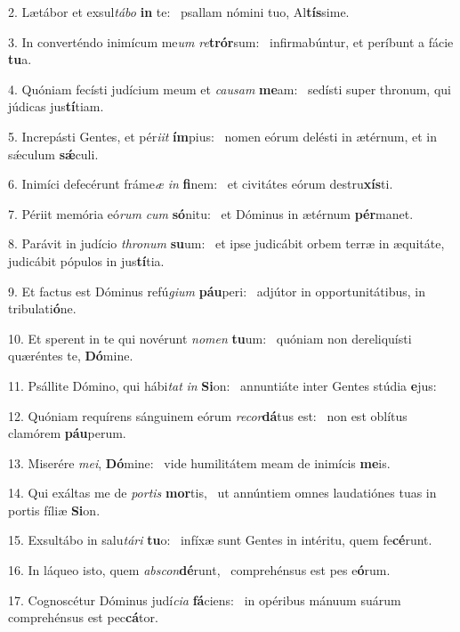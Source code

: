 2. Lætábor et exsul\textit{tá}\textit{bo} \textbf{in} te: \ast\  psallam nómini tuo, Al\textbf{tís}sime.\

3. In converténdo inimícum me\textit{um} \textit{re}\textbf{trór}sum: \ast\  infirmabúntur, et períbunt a fácie \textbf{tu}a.\

4. Quóniam fecísti judícium meum et \textit{cau}\textit{sam} \textbf{me}am: \ast\  sedísti super thronum, qui júdicas jus\textbf{tí}tiam.\

5. Increpásti Gentes, et pér\textit{i}\textit{it} \textbf{ím}pius: \ast\  nomen eórum delésti in ætérnum, et in sǽculum \textbf{sǽ}culi.\

6. Inimíci defecérunt fráme\textit{æ} \textit{in} \textbf{fi}nem: \ast\  et civitátes eórum destru\textbf{xís}ti.\

7. Périit memória eó\textit{rum} \textit{cum} \textbf{só}nitu: \ast\  et Dóminus in ætérnum \textbf{pér}manet.\

8. Parávit in judício \textit{thro}\textit{num} \textbf{su}um: \ast\  et ipse judicábit orbem terræ in æquitáte, judicábit pópulos in jus\textbf{tí}tia.\

9. Et factus est Dóminus refú\textit{gi}\textit{um} \textbf{páu}peri: \ast\  adjútor in opportunitátibus, in tribulati\textbf{ó}ne.\

10. Et sperent in te qui novérunt \textit{no}\textit{men} \textbf{tu}um: \ast\  quóniam non dereliquísti quæréntes te, \textbf{Dó}mine.\

11. Psállite Dómino, qui hábi\textit{tat} \textit{in} \textbf{Si}on: \ast\  annuntiáte inter Gentes stúdia \textbf{e}jus:\

12. Quóniam requírens sánguinem eórum \textit{re}\textit{cor}\textbf{dá}tus est: \ast\  non est oblítus clamórem \textbf{páu}perum.\

13. Miserére \textit{me}\textit{i}, \textbf{Dó}mine: \ast\  vide humilitátem meam de inimícis \textbf{me}is.\

14. Qui exáltas me de \textit{por}\textit{tis} \textbf{mor}tis, \ast\  ut annúntiem omnes laudatiónes tuas in portis fíliæ \textbf{Si}on.\

15. Exsultábo in salu\textit{tá}\textit{ri} \textbf{tu}o: \ast\  infíxæ sunt Gentes in intéritu, quem fe\textbf{cé}runt.\

16. In láqueo isto, quem \textit{abs}\textit{con}\textbf{dé}runt, \ast\  comprehénsus est pes e\textbf{ó}rum.\

17. Cognoscétur Dóminus judí\textit{ci}\textit{a} \textbf{fá}ciens: \ast\  in opéribus mánuum suárum comprehénsus est pec\textbf{cá}tor.\

